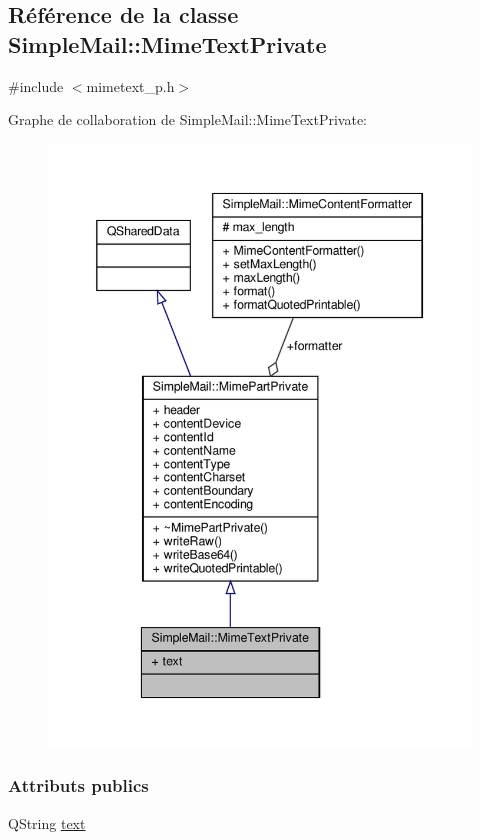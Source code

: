 \hypertarget{class_simple_mail_1_1_mime_text_private}{}\subsection{Référence de la classe Simple\+Mail\+:\+:Mime\+Text\+Private}
\label{class_simple_mail_1_1_mime_text_private}


{\ttfamily \#include $<$mimetext\+\_\+p.\+h$>$}



Graphe de collaboration de Simple\+Mail\+:\+:Mime\+Text\+Private\+:\nopagebreak
\begin{figure}[H]
\begin{center}
\leavevmode
\includegraphics[width=346pt]{class_simple_mail_1_1_mime_text_private__coll__graph}
\end{center}
\end{figure}
\subsubsection*{Attributs publics}
\begin{DoxyCompactItemize}
\item 
Q\+String \hyperlink{class_simple_mail_1_1_mime_text_private_a0df65c3c8ea26418893245c22394dc7f}{text}
\end{DoxyCompactItemize}
